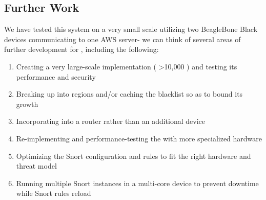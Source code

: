 \subsection{Further Work}
\label{sec:concl:further}
We have tested this system on a very small scale utilizing two BeagleBone Black devices communicating to one AWS server- we can think of several areas of further development for \sysname, including the following:

\begin{enumerate}
\item Creating a very large-scale implementation ( \textgreater 10,000 \nodenames) and testing its performance and security
\item Breaking up \servnames into regions and/or caching the blacklist so as to bound its growth
\item Incorporating \sysname into a router rather than an additional device
\item Re-implementing and performance-testing the \nodename with more specialized hardware
\item Optimizing the Snort configuration and rules to fit the right hardware and threat model
\item Running multiple Snort instances in a multi-core device to prevent downtime while Snort rules reload
\end{enumerate}




